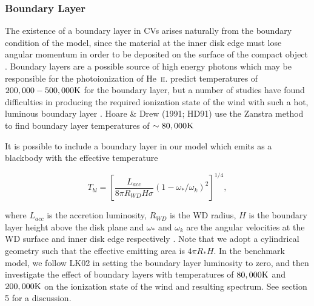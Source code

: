 \documentclass[preprint, a4paper, 11pt]{aastex}
\begin{document}
\subsubsection{Boundary Layer}
The existence of a boundary layer in CVs arises naturally from the boundary condition
of the \cite{shakurasunyaev1973} model, since the material at the inner disk
edge must lose angular momentum in order to be deposited on
the surface of the compact object \cite[see e.g.][]{lyndenbell1974}.
Boundary layers are a possible source of
high energy photons which may be responsible for the photoionization of 
He~\textsc{ii}. 
\cite{pringlesavonije1979} predict temperatures of 
$200,000-500,000{\rm K}$ for the boundary layer,
but a number of studies have found difficulties
in producing the required ionization state of the wind
with such a hot, luminous boundary layer 
\citep[see e.g.][]{maucheraymond1987, drewverbunt1985}.
Hoare \& Drew (1991; HD91) \nocite{hoare1991}
use the Zanstra method to find boundary layer temperatures of
$\sim80,000{\rm K}$


It is possible to include a boundary layer in our model which emits 
as a blackbody with the effective temperature

\begin{equation}
T_{bl} = \left[ \frac{L_{acc}}{8 \pi R_{WD} H \sigma} ( 1 - \omega_*/\omega_k)^2 \right]^{1/4},
\label{bl}
\end{equation}

where $L_{acc}$ is the accretion luminosity, $R_{WD}$ is the WD radius, $H$ is the boundary layer height
above the disk plane
and $\omega_*$ and $\omega_k$ are the angular velocities at the WD surface and inner disk edge respectively
\citep{fkrbook}. Note that we adopt a cylindrical geometry such that the effective emitting
area is $4 \pi R_* H$. 
In the benchmark model, we follow LK02 in setting the boundary layer
luminosity to zero, and then investigate the effect
of boundary layers with temperatures of $80,000{\rm K}$ and $200,000{\rm K}$ 
on the ionization state of the wind and resulting
spectrum. See section 5 for a discussion.
\end{document}
